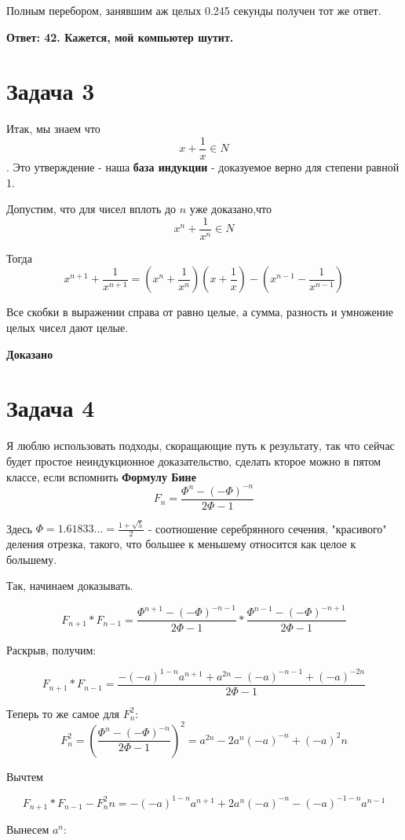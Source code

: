 \documentclass[11pt]{article}
\begin{document}
Полным перебором, занявшим аж целых 0.245 секунды получен тот же ответ.

\textbf{Ответ: 42. Кажется, мой компьютер шутит.}

\section{Задача 3}

Итак, мы знаем что $$x+\frac{1}{x} \in N$$. Это утверждение - наша \textbf{база индукции} - доказуемое верно для степени равной 1.

Допустим, что для чисел вплоть до $n$ уже доказано,что $$x^n + \frac{1}{x^n} \in N$$

Тогда $$x^{n+1} + \frac{1}{x^{n+1}} = (x^n +\frac{1}{x^n})(x +\frac{1}{x})-(x^{n-1} - \frac{1}{x^{n-1}})$$

Все скобки в выражении справа от равно целые, а сумма, разность и умножение целых чисел дают целые.

\textbf{Доказано}

\section{Задача 4}

Я люблю использовать подходы, скоращающие путь к результату, так что сейчас будет простое неиндукционное доказательство, сделать кторое можно в пятом классе, если вспомнить \textbf{Формулу Бине}
$$F_n = \frac{\Phi^n  - (-\Phi)^{-n}}{2\Phi-1}$$

Здесь $\Phi = 1.61833... = \frac{1+\sqrt{5}}{2}$ - соотношение серебрянного сечения, "красивого" деления отрезка, такого, что большее к меньшему относится как целое к большему.

Так, начинаем доказывать. 

$$F_{n+1} * F_{n-1} = \frac{\Phi^{n+1} - (-\Phi)^{-n-1}}{2\Phi-1}*\frac{\Phi^{n-1} - (-\Phi)^{-n+1}}{2\Phi-1} $$

Раскрыв, получим:

$$F_{n+1} * F_{n-1} = \frac{-(-a)^{1-n} a^{n+1} + a^{2n} - (-a)^{-n-1} + (-a)^{-2n}}{2 \Phi-1}$$

Теперь то же самое для $F_n^2$:
$$F_n^2 = (\frac{\Phi^n  - (-\Phi)^{-n}}{2\Phi-1})^2 = a^{2n} - 2a^n(-a)^{-n} + (-a)^2n$$

Вычтем

$$F_{n+1} * F_{n-1} - F_n^2n = -(-a)^{1-n}a^{n+1} + 2a^n(-a)^{-n} - (-a)^{-1-n}a^{n-1}$$

Вынесем $a^n$:
\end{document}
